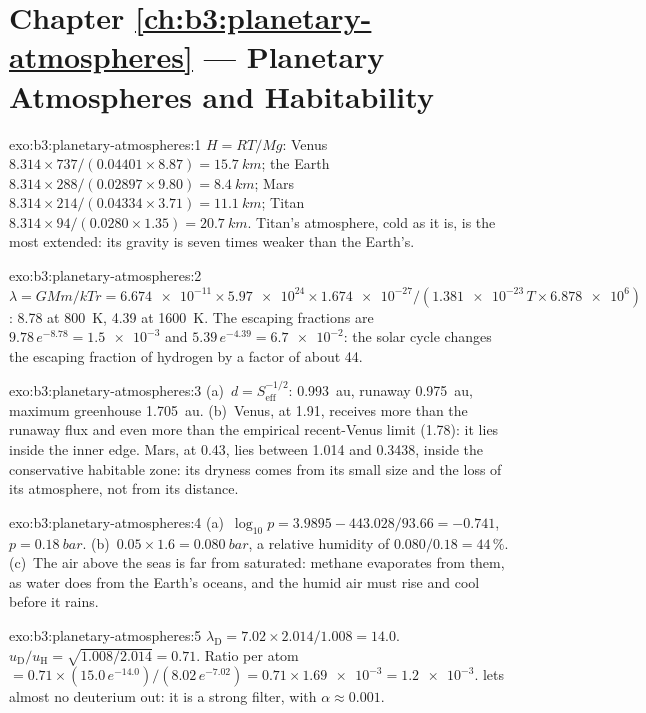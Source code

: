 \section*{Chapter \ref{ch:b3:planetary-atmospheres} --- Planetary Atmospheres and Habitability}

\begin{solution}{exo:b3:planetary-atmospheres:1}
$H = RT/Mg$: Venus $8.314\times737/(0.04401\times8.87) = \qty{15.7}{km}$;
the Earth $8.314\times288/(0.02897\times9.80) = \qty{8.4}{km}$; Mars
$8.314\times214/(0.04334\times3.71) = \qty{11.1}{km}$; Titan
$8.314\times94/(0.0280\times1.35) = \qty{20.7}{km}$. Titan's atmosphere,
cold as it is, is the most extended: its gravity is seven times weaker
than the Earth's.
\end{solution}

\begin{solution}{exo:b3:planetary-atmospheres:2}
$\lambda = GMm/kTr = \num{6.674e-11}\times\num{5.97e24}\times\num{1.674e-27}
/(\num{1.381e-23}\,T\times\num{6.878e6})$: 8.78 at \qty{800}{K}, 4.39 at
\qty{1600}{K}. The escaping fractions are $9.78\,e^{-8.78} =
\num{1.5e-3}$ and $5.39\,e^{-4.39} = \num{6.7e-2}$: the solar cycle
changes the escaping fraction of hydrogen by a factor of about 44.
\end{solution}

\begin{solution}{exo:b3:planetary-atmospheres:3}
(a)~$d = S_\mathrm{eff}^{-1/2}$:  \qty{0.993}{au}, runaway
\qty{0.975}{au}, maximum greenhouse \qty{1.705}{au}. (b)~Venus, at 1.91,
receives more than the runaway flux and even more than the empirical
recent-Venus limit (1.78): it lies inside the inner edge. Mars, at 0.43,
lies between 1.014 and 0.3438, inside the conservative habitable zone:
its dryness comes from its small size and the loss of its atmosphere, not
from its distance.
\end{solution}

\begin{solution}{exo:b3:planetary-atmospheres:4}
(a)~$\log_{10}p = 3.9895 - 443.028/93.66 = -0.741$, $p =
\qty{0.18}{bar}$. (b)~$0.05\times1.6 = \qty{0.080}{bar}$, a relative
humidity of $0.080/0.18 = 44\,\%$. (c)~The air above the seas is far from
saturated: methane evaporates from them, as water does from the Earth's
oceans, and the humid air must rise and cool before it rains.
\end{solution}

\begin{solution}{exo:b3:planetary-atmospheres:5}
$\lambda_\mathrm D = 7.02\times2.014/1.008 = 14.0$. $u_\mathrm D/u_\mathrm H
= \sqrt{1.008/2.014} = 0.71$. Ratio per atom $= 0.71\times(15.0\,
e^{-14.0})/(8.02\,e^{-7.02}) = 0.71\times\num{1.69e-3} = \num{1.2e-3}$.
 lets almost no deuterium out: it is a strong filter, with
$\alpha \approx 0.001$.
\end{solution}


